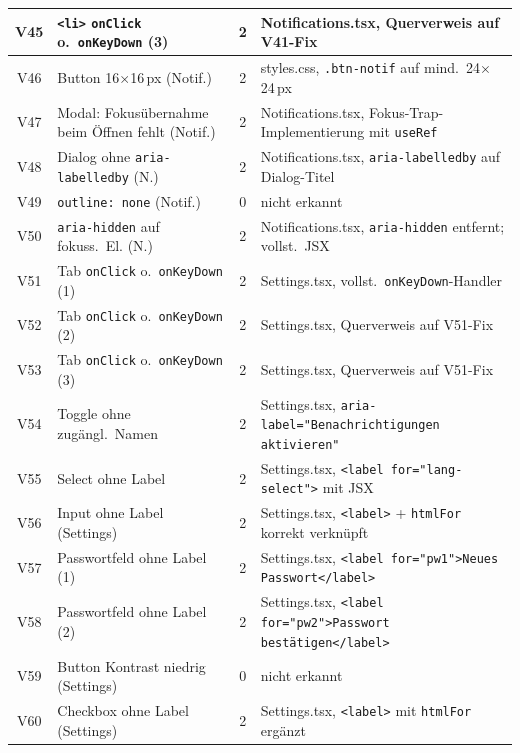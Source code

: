 \begin{longtable}{|c|p{5.0cm}|c|p{5.4cm}|}
V45  & \texttt{<li>} \texttt{onClick} o.\ \texttt{onKeyDown} (3) & 2 & Notifications.tsx, Querverweis auf V41-Fix \\ \hline
V46  & Button 16$\times$16\,px (Notif.)             & 2 & styles.css, \texttt{.btn-notif} auf mind.\ 24$\times$24\,px \\ \hline
V47  & Modal: Fokusübernahme beim Öffnen fehlt (Notif.)               & 2 & Notifications.tsx, Fokus-Trap-Implementierung mit \texttt{useRef} \\ \hline
V48  & Dialog ohne \texttt{aria-labelledby} (N.)    & 2 & Notifications.tsx, \texttt{aria-labelledby} auf Dialog-Titel \\ \hline
V49  & \texttt{outline: none} (Notif.)              & 0 & nicht erkannt \\ \hline
V50  & \texttt{aria-hidden} auf fokuss.\ El. (N.)   & 2 & Notifications.tsx, \texttt{aria-hidden} entfernt; vollst.\ \ac{JSX} \\ \hline
V51  & Tab \texttt{onClick} o.\ \texttt{onKeyDown} (1) & 2 & Settings.tsx, vollst.\ \texttt{onKeyDown}-Handler \\ \hline
V52  & Tab \texttt{onClick} o.\ \texttt{onKeyDown} (2) & 2 & Settings.tsx, Querverweis auf V51-Fix \\ \hline
V53  & Tab \texttt{onClick} o.\ \texttt{onKeyDown} (3) & 2 & Settings.tsx, Querverweis auf V51-Fix \\ \hline
V54  & Toggle ohne zugängl.\ Namen                 & 2 & Settings.tsx, \texttt{aria-label="Be\-nach\-rich\-ti\-gun\-gen aktivieren"} \\ \hline
V55  & Select ohne Label                            & 2 & Settings.tsx, \texttt{<label for="lang-select">} mit \ac{JSX} \\ \hline
V56  & Input ohne Label (Settings)                  & 2 & Settings.tsx, \texttt{<label>} + \texttt{htmlFor} korrekt verknüpft \\ \hline
V57  & Passwortfeld ohne Label (1)                  & 2 & Settings.tsx, \texttt{<label for="pw1">Neues Passwort</label>} \\ \hline
V58  & Passwortfeld ohne Label (2)                  & 2 & Settings.tsx, \texttt{<label for="pw2">Passwort bestätigen</label>} \\ \hline
V59  & Button Kontrast niedrig (Settings)           & 0 & nicht erkannt \\ \hline
V60  & Checkbox ohne Label (Settings)               & 2 & Settings.tsx, \texttt{<label>} mit \texttt{htmlFor} ergänzt \\ \hline

\end{longtable}
